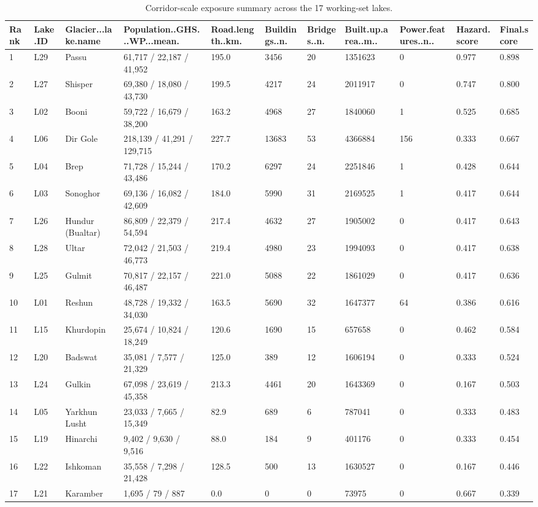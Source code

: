\begin{table}[ht]
\centering
\scriptsize
\caption{Corridor-scale exposure summary across the 17 working-set lakes.}
\label{tab:corridor_exposure}
\begin{tabular}{lllllllllll}
\hline
Rank & Lake.ID & Glacier...lake.name & Population..GHS...WP...mean. & Road.length..km. & Buildings..n. & Bridges..n. & Built.up.area..m.. & Power.features..n.. & Hazard.score & Final.score \\
\hline
 1 & L29 & Passu & 61,717 / 22,187 / 41,952 & 195.0 &  3456 & 20 & 1351623 &   0 & 0.977 & 0.898 \\
 2 & L27 & Shisper & 69,380 / 18,080 / 43,730 & 199.5 &  4217 & 24 & 2011917 &   0 & 0.747 & 0.800 \\
 3 & L02 & Booni & 59,722 / 16,679 / 38,200 & 163.2 &  4968 & 27 & 1840060 &   1 & 0.525 & 0.685 \\
 4 & L06 & Dir Gole & 218,139 / 41,291 / 129,715 & 227.7 & 13683 & 53 & 4366884 & 156 & 0.333 & 0.667 \\
 5 & L04 & Brep & 71,728 / 15,244 / 43,486 & 170.2 &  6297 & 24 & 2251846 &   1 & 0.428 & 0.644 \\
 6 & L03 & Sonoghor & 69,136 / 16,082 / 42,609 & 184.0 &  5990 & 31 & 2169525 &   1 & 0.417 & 0.644 \\
 7 & L26 & Hundur (Bualtar) & 86,809 / 22,379 / 54,594 & 217.4 &  4632 & 27 & 1905002 &   0 & 0.417 & 0.643 \\
 8 & L28 & Ultar & 72,042 / 21,503 / 46,773 & 219.4 &  4980 & 23 & 1994093 &   0 & 0.417 & 0.638 \\
 9 & L25 & Gulmit & 70,817 / 22,157 / 46,487 & 221.0 &  5088 & 22 & 1861029 &   0 & 0.417 & 0.636 \\
10 & L01 & Reshun & 48,728 / 19,332 / 34,030 & 163.5 &  5690 & 32 & 1647377 &  64 & 0.386 & 0.616 \\
11 & L15 & Khurdopin & 25,674 / 10,824 / 18,249 & 120.6 &  1690 & 15 &  657658 &   0 & 0.462 & 0.584 \\
12 & L20 & Badswat & 35,081 / 7,577 / 21,329 & 125.0 &   389 & 12 & 1606194 &   0 & 0.333 & 0.524 \\
13 & L24 & Gulkin & 67,098 / 23,619 / 45,358 & 213.3 &  4461 & 20 & 1643369 &   0 & 0.167 & 0.503 \\
14 & L05 & Yarkhun Lusht & 23,033 / 7,665 / 15,349 &  82.9 &   689 &  6 &  787041 &   0 & 0.333 & 0.483 \\
15 & L19 & Hinarchi & 9,402 / 9,630 / 9,516 &  88.0 &   184 &  9 &  401176 &   0 & 0.333 & 0.454 \\
16 & L22 & Ishkoman & 35,558 / 7,298 / 21,428 & 128.5 &   500 & 13 & 1630527 &   0 & 0.167 & 0.446 \\
17 & L21 & Karamber & 1,695 / 79 / 887 &   0.0 &     0 &  0 &   73975 &   0 & 0.667 & 0.339 \\
\hline
\end{tabular}
\end{table}
